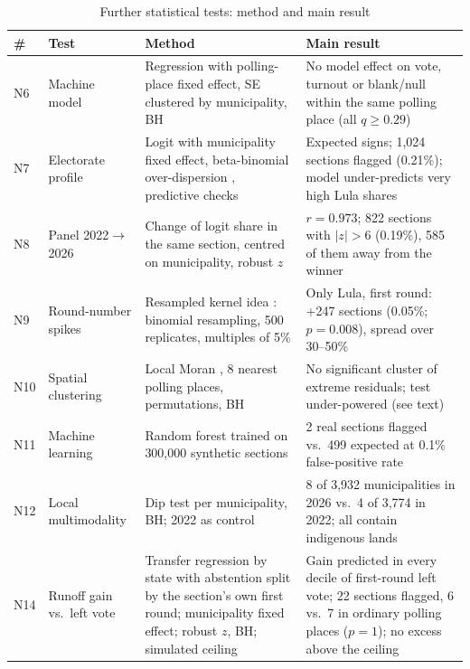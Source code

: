 \begin{table}[ht]
\caption{Further statistical tests: method and main result}
\label{tab:nsummary}
\centering\scriptsize
\begin{tabular}{@{}l L{3.3cm} L{5.4cm} L{6.4cm}@{}}
\toprule
\textbf{\#} & \textbf{Test} & \textbf{Method} & \textbf{Main result} \\
\midrule
N6 & Machine model & Regression with polling-place fixed effect, SE clustered by municipality, BH & No model effect on vote, turnout or blank/null within the same polling place (all $q\geq0.29$) \\
N7 & Electorate profile & Logit with municipality fixed effect, beta-binomial over-dispersion \cite{williams1982}, predictive checks \cite{gelman1996} & Expected signs; 1,024 sections flagged (0.21\%); model under-predicts very high Lula shares \\
N8 & Panel 2022$\to$2026 & Change of logit share in the same section, centred on municipality, robust $z$ & $r=0.973$; 822 sections with $|z|>6$ (0.19\%), 585 of them away from the winner \\
N9 & Round-number spikes & Resampled kernel idea \cite{rozenas2017}: binomial resampling, 500 replicates, multiples of 5\% & Only Lula, first round: +247 sections (0.05\%; $p=0.008$), spread over 30--50\% \\
N10 & Spatial clustering & Local Moran \cite{anselin1995}, 8 nearest polling places, permutations, BH & No significant cluster of extreme residuals; test under-powered (see text) \\
N11 & Machine learning & Random forest \cite{breiman2001,wright2017} trained on 300,000 synthetic sections & 2 real sections flagged vs.\ 499 expected at 0.1\% false-positive rate \\
N12 & Local multimodality & Dip test \cite{hartigan1985} per municipality, BH; 2022 as control & 8 of 3,932 municipalities in 2026 vs.\ 4 of 3,774 in 2022; all contain indigenous lands \\
N14 & Runoff gain vs.\ left vote & Transfer regression by state with abstention split by the section's own first round; municipality fixed effect; robust $z$, BH; simulated ceiling & Gain predicted in every decile of first-round left vote; 22 sections flagged, 6 vs.\ 7 in ordinary polling places ($p=1$); no excess above the ceiling \\
\bottomrule
\end{tabular}
\end{table}

